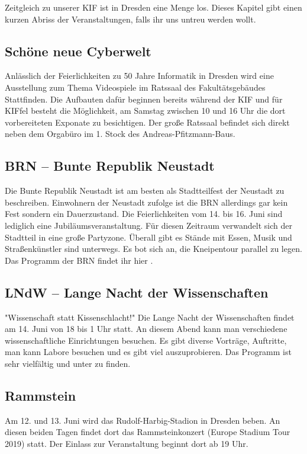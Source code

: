 Zeitgleich zu unserer KIF ist in Dresden eine Menge los. Dieses Kapitel gibt einen kurzen Abriss der Veranstaltungen, falls ihr uns untreu werden wollt.

\subsection*{Schöne neue Cyberwelt}
Anlässlich der Feierlichkeiten zu 50 Jahre Informatik in Dresden wird eine Ausstellung zum Thema Videospiele im Ratssaal des Fakultätsgebäudes Stattfinden.
Die Aufbauten dafür beginnen bereits während der KIF und für KIFfel besteht die Möglichkeit, am Samstag zwischen 10 und 16 Uhr die dort vorbereiteten Exponate zu besichtigen.
Der große Ratssaal befindet sich direkt neben dem Orgabüro im 1. Stock des Andreas-Pfitzmann-Baus.


\subsection*{BRN -- Bunte Republik Neustadt}
Die Bunte Republik Neustadt ist am besten als Stadtteilfest der Neustadt zu beschreiben.
Einwohnern der Neustadt zufolge ist die BRN allerdings gar kein Fest sondern ein Dauerzustand.
Die Feierlichkeiten vom 14. bis 16. Juni sind lediglich eine Jubiläumsveranstaltung.
Für diesen Zeitraum verwandelt sich der Stadtteil in eine große Partyzone.
Überall gibt es Stände mit Essen, Musik und Straßenkünstler sind unterwegs.
Es bot sich an, die Kneipentour parallel zu legen.
Das Programm der BRN findet ihr hier .

\subsection*{LNdW -- Lange Nacht der Wissenschaften}
"Wissenschaft statt Kissenschlacht!"
Die Lange Nacht der Wissenschaften findet am 14. Juni von 18 bis 1 Uhr statt.
An diesem Abend kann man verschiedene wissenschaftliche Einrichtungen besuchen.
Es gibt diverse Vorträge, Auftritte, man kann Labore besuchen und es gibt viel auszuprobieren.
Das Programm ist sehr vielfältig und unter  zu finden.

\subsection*{Rammstein}
Am 12. und 13. Juni wird das Rudolf-Harbig-Stadion in Dresden beben.
An diesen beiden Tagen findet dort das Rammsteinkonzert (Europe Stadium Tour 2019) statt.
Der Einlass zur Veranstaltung beginnt dort ab 19 Uhr.

